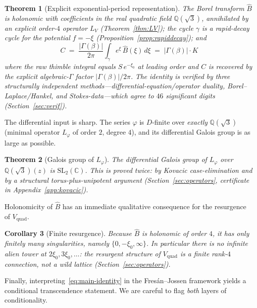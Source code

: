\documentclass[11pt,reqno]{amsart}
\theoremstyle{plain}
\newtheorem{theorem}{Theorem}[section]
\newtheorem{corollary}[theorem]{Corollary}
\theoremstyle{definition}
\newcommand{\Vquad}{V_{\mathrm{quad}}}
\newcommand{\Bhat}{\widehat{B}}
\newcommand{\Lphi}{L_{\varphi}}
\newcommand{\LV}{L_{V}}
\newcommand{\Qsqrt}{\mathbb{Q}(\sqrt3)}
\newcommand{\xizero}{\xi_0}
\newcommand{\SL}{\mathrm{SL}}
\providecommand{\C}{}\renewcommand{\C}{C}
\begin{document}
\begin{theorem}[Explicit exponential-period representation]\label{thm:main}
The Borel transform $\Bhat$ is holonomic with coefficients in the real quadratic field
$\Qsqrt$, annihilated by an explicit order-$4$ operator $\LV$ (Theorem~\ref{thm:LV}); the
cycle $\gamma$ is a rapid-decay cycle for the potential $f=-\xi$
(Proposition~\ref{prop:rapiddecay}); and
\begin{equation}\label{eq:main-identity}
  \boxed{\;\C\;=\;\frac{\lvert\Gamma(\beta)\rvert}{2\pi}\int_{\gamma} e^{\xi}\,\Bhat(\xi)\,d\xi
  \;=\;\lvert\Gamma(\beta)\rvert\cdot K\;}
\end{equation}
where the raw thimble integral equals $S\,e^{-\xizero}$ at leading order and $\C$ is recovered
by the explicit algebraic-$\Gamma$ factor $\lvert\Gamma(\beta)\rvert/2\pi$. The identity is
verified by three structurally independent methods---differential-equation/operator duality,
Borel--Laplace/Hankel, and Stokes-data---which agree to $46$ significant digits
(Section~\ref{sec:verif}).
\end{theorem}

The differential input is sharp. The series $\varphi$ is $D$-finite over \emph{exactly} $\Qsqrt$
(minimal operator $\Lphi$ of order $2$, degree $4$), and its differential Galois group is as
large as possible.

\begin{theorem}[Galois group of $\Lphi$]\label{thm:galois}
The differential Galois group of $\Lphi$ over $\Qsqrt(z)$ is $\SL_2(\mathbb{C})$. This is proved
twice: by Kovacic case-elimination and by a structural torus-plus-unipotent argument
(Section~\ref{sec:operators}, certificate in Appendix~\ref{app:kovacic}).
\end{theorem}

Holonomicity of $\Bhat$ has an immediate qualitative consequence for the resurgence of $\Vquad$.

\begin{corollary}[Finite resurgence]\label{cor:finite}
Because $\Bhat$ is holonomic of order $4$, it has only finitely many singularities, namely
$\{0,-\xizero,\infty\}$. In particular there is \emph{no} infinite alien tower at
$2\xizero,3\xizero,\dots$: the resurgent structure of $\Vquad$ is a finite rank-$4$ connection,
not a wild lattice (Section~\ref{sec:operators}).
\end{corollary}

Finally, interpreting~\eqref{eq:main-identity} in the Fres\'an--Jossen framework yields a
conditional transcendence statement. We are careful to flag \emph{both} layers of
conditionality.
\end{document}
